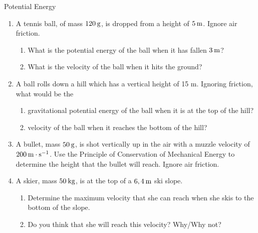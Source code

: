     \noindent
\label{m38786*secfhsst!!!underscore!!!id2545}
\begin{exercises}{Potential Energy }
            \nopagebreak \noindent
            \label{m38786*id70623}\begin{enumerate}[noitemsep, label=\textbf{\arabic*}. ] 
            \label{m38786*uid95}\item A tennis ball, of mass $120\phantom{\rule{2pt}{0ex}}\text{g}$, is dropped from a height of $5\phantom{\rule{2pt}{0ex}}\text{m}$. Ignore air friction.
\label{m38786*id70639}\begin{enumerate}[noitemsep, label=\textbf{\alph*}. ] 
            \label{m38786*uid96}\item What is the potential energy of the ball when it has fallen $3\phantom{\rule{2pt}{0ex}}\text{m}$?
\label{m38786*uid97}\item What is the velocity of the ball when it hits the ground?
\end{enumerate}

\item A ball rolls down a hill which has a vertical height of 15 m. Ignoring friction, what would be the
\begin{enumerate}[noitemsep, label=\textbf{\alph*}. ] 
\item gravitational potential energy of the ball when it is at the top of the hill?
\item velocity of the ball when it reaches the bottom of the hill?
\end{enumerate}

\item A bullet, mass $50\phantom{\rule{2pt}{0ex}}\text{g}$, is shot vertically up in the air with a muzzle velocity of $200\phantom{\rule{2pt}{0ex}}\text{m}\ensuremath{\cdot}\text{s}{}^{-1}$. Use the Principle of Conservation of Mechanical Energy to determine the height that the bullet will reach. Ignore air friction.\newline
\item A skier, mass $50\phantom{\rule{2pt}{0ex}}\text{kg}$, is at the top of a $6,4\phantom{\rule{2pt}{0ex}}\text{m}$ ski slope.
\begin{enumerate}[noitemsep, label=\textbf{\alph*}. ] 
\item Determine the maximum velocity that she can reach when she skis to the bottom of the slope.
\item Do you think that she will reach this velocity? Why/Why not?
\end{enumerate}


\end{enumerate}
\end{exercises}

